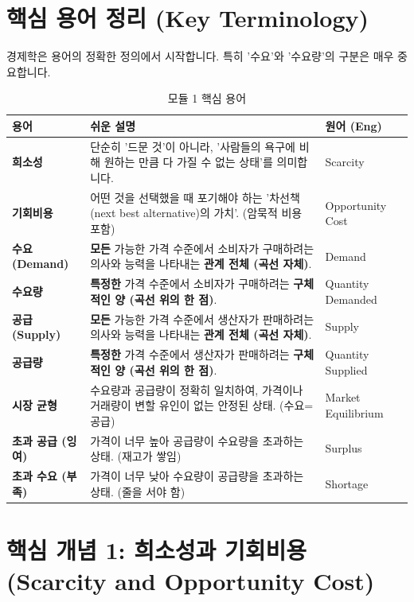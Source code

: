 \documentclass[11pt,a4paper]{article}
\theoremstyle{definition}
\begin{document}
\section{핵심 용어 정리 (Key Terminology)}

경제학은 용어의 정확한 정의에서 시작합니다. 특히 '수요'와 '수요량'의 구분은 매우 중요합니다.

\begin{table}[h!]
\centering
\caption{모듈 1 핵심 용어}
\label{tab:key_terms}
\small
\begin{tabularx}{\textwidth}{>{\raggedright\arraybackslash}p{2.5cm} >{\raggedright\arraybackslash}X >{\raggedright\arraybackslash}p{3cm}}
\toprule
\textbf{용어} & \textbf{쉬운 설명} & \textbf{원어 (Eng)} \\
\midrule
\textbf{희소성} & 단순히 '드문 것'이 아니라, '사람들의 욕구에 비해 원하는 만큼 다 가질 수 없는 상태'를 의미합니다. & Scarcity \\
\textbf{기회비용} & 어떤 것을 선택했을 때 포기해야 하는 '차선책(next best alternative)의 가치'. (암묵적 비용 포함) & Opportunity Cost \\
\textbf{수요 (Demand)} & \textbf{모든} 가능한 가격 수준에서 소비자가 구매하려는 의사와 능력을 나타내는 \textbf{관계 전체 (곡선 자체)}. & Demand \\
\textbf{수요량} & \textbf{특정한} 가격 수준에서 소비자가 구매하려는 \textbf{구체적인 양 (곡선 위의 한 점)}. & Quantity Demanded \\
\textbf{공급 (Supply)} & \textbf{모든} 가능한 가격 수준에서 생산자가 판매하려는 의사와 능력을 나타내는 \textbf{관계 전체 (곡선 자체)}. & Supply \\
\textbf{공급량} & \textbf{특정한} 가격 수준에서 생산자가 판매하려는 \textbf{구체적인 양 (곡선 위의 한 점)}. & Quantity Supplied \\
\textbf{시장 균형} & 수요량과 공급량이 정확히 일치하여, 가격이나 거래량이 변할 유인이 없는 안정된 상태. (수요=공급) & Market Equilibrium \\
\textbf{초과 공급 (잉여)} & 가격이 너무 높아 공급량이 수요량을 초과하는 상태. (재고가 쌓임) & Surplus \\
\textbf{초과 수요 (부족)} & 가격이 너무 낮아 수요량이 공급량을 초과하는 상태. (줄을 서야 함) & Shortage \\
\bottomrule
\end{tabularx}
\end{table}

\newpage

\section{핵심 개념 1: 희소성과 기회비용 (Scarcity and Opportunity Cost)}
\end{document}
